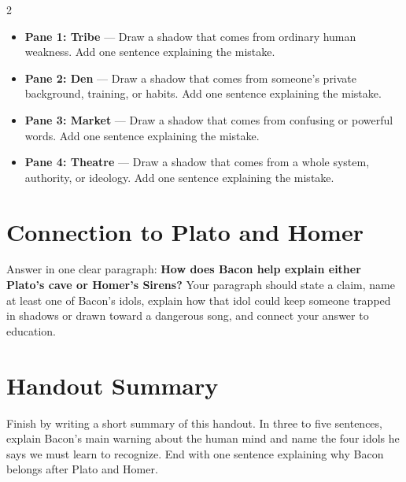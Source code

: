 \documentclass[12pt]{article}
\begin{document}
\begin{multicols}{2}
\begin{itemize}[leftmargin=*, itemsep=0.2em]
\item \textbf{Pane 1: Tribe} --- Draw a shadow that comes from ordinary human weakness. Add one sentence explaining the mistake.
\item \textbf{Pane 2: Den} --- Draw a shadow that comes from someone's private background, training, or habits. Add one sentence explaining the mistake.
\item \textbf{Pane 3: Market} --- Draw a shadow that comes from confusing or powerful words. Add one sentence explaining the mistake.
\item \textbf{Pane 4: Theatre} --- Draw a shadow that comes from a whole system, authority, or ideology. Add one sentence explaining the mistake.
\end{itemize}

\section*{Connection to Plato and Homer}
Answer in one clear paragraph: \textbf{How does Bacon help explain either Plato's cave or Homer's Sirens?} Your paragraph should state a claim, name at least one of Bacon's idols, explain how that idol could keep someone trapped in shadows or drawn toward a dangerous song, and connect your answer to education.

\section*{Handout Summary}
Finish by writing a short summary of this handout. In three to five sentences, explain Bacon's main warning about the human mind and name the four idols he says we must learn to recognize. End with one sentence explaining why Bacon belongs after Plato and Homer.

\end{multicols}
\end{document}
